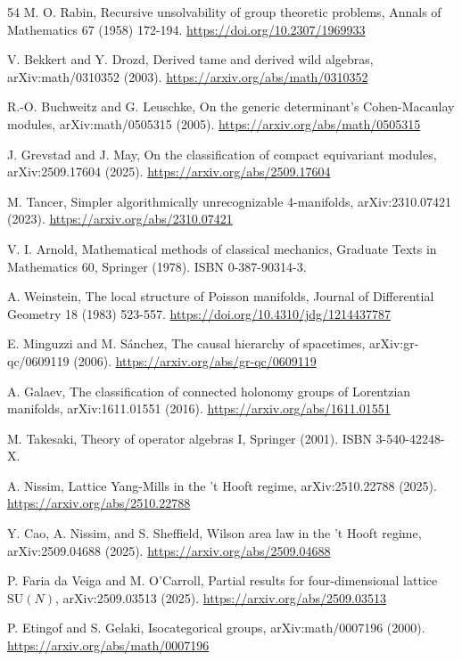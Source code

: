 \documentclass[11pt,letterpaper]{article}
\theoremstyle{definition}
\theoremstyle{remark}
\begin{document}
\begin{thebibliography}{54}
 M. O. Rabin, Recursive unsolvability of group theoretic problems, Annals of Mathematics 67 (1958) 172-194. \url{https://doi.org/10.2307/1969933}

 V. Bekkert and Y. Drozd, Derived tame and derived wild algebras, arXiv:math/0310352 (2003). \url{https://arxiv.org/abs/math/0310352}

 R.-O. Buchweitz and G. Leuschke, On the generic determinant's Cohen-Macaulay modules, arXiv:math/0505315 (2005). \url{https://arxiv.org/abs/math/0505315}

 J. Grevstad and J. May, On the classification of compact equivariant modules, arXiv:2509.17604 (2025). \url{https://arxiv.org/abs/2509.17604}

 M. Tancer, Simpler algorithmically unrecognizable 4-manifolds, arXiv:2310.07421 (2023). \url{https://arxiv.org/abs/2310.07421}

 V. I. Arnold, Mathematical methods of classical mechanics, Graduate Texts in Mathematics 60, Springer (1978). ISBN 0-387-90314-3.

 A. Weinstein, The local structure of Poisson manifolds, Journal of Differential Geometry 18 (1983) 523-557. \url{https://doi.org/10.4310/jdg/1214437787}

 E. Minguzzi and M. S\'anchez, The causal hierarchy of spacetimes, arXiv:gr-qc/0609119 (2006). \url{https://arxiv.org/abs/gr-qc/0609119}

 A. Galaev, The classification of connected holonomy groups of Lorentzian manifolds, arXiv:1611.01551 (2016). \url{https://arxiv.org/abs/1611.01551}

 M. Takesaki, Theory of operator algebras I, Springer (2001). ISBN 3-540-42248-X.

 A. Nissim, Lattice Yang-Mills in the 't Hooft regime, arXiv:2510.22788 (2025). \url{https://arxiv.org/abs/2510.22788}

 Y. Cao, A. Nissim, and S. Sheffield, Wilson area law in the 't Hooft regime, arXiv:2509.04688 (2025). \url{https://arxiv.org/abs/2509.04688}

 P. Faria da Veiga and M. O'Carroll, Partial results for four-dimensional lattice $\mathrm{SU}(N)$, arXiv:2509.03513 (2025). \url{https://arxiv.org/abs/2509.03513}

 P. Etingof and S. Gelaki, Isocategorical groups, arXiv:math/0007196 (2000). \url{https://arxiv.org/abs/math/0007196}


\end{thebibliography}
\end{document}

